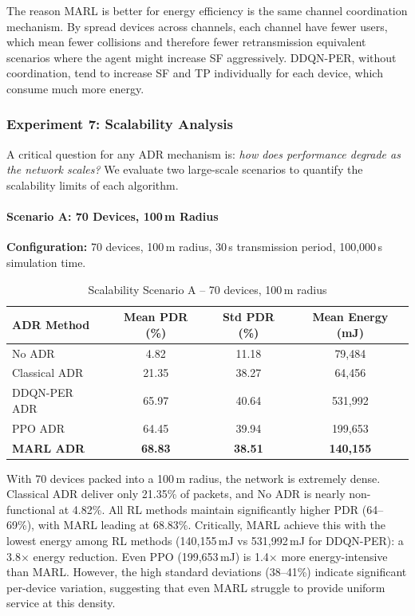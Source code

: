 \documentclass[12pt,a4paper]{article}
\begin{document}
The reason MARL is better for energy efficiency is the same channel coordination mechanism. By spread devices across channels, each channel have fewer users, which mean fewer collisions and therefore fewer retransmission equivalent scenarios where the agent might increase SF aggressively. DDQN-PER, without coordination, tend to increase SF and TP individually for each device, which consume much more energy.


\subsubsection{Experiment 7: Scalability Analysis}
\label{sec:exp7_scalability}

A critical question for any ADR mechanism is: \textit{how does performance degrade as the network scales?} We evaluate two large-scale scenarios to quantify the scalability limits of each algorithm.

\paragraph{Scenario A: 70 Devices, 100\,m Radius}

\textbf{Configuration:} 70 devices, 100\,m radius, 30\,s transmission period, 100,000\,s simulation time.

\begin{table}[H]
\centering
\caption{Scalability Scenario A -- 70 devices, 100\,m radius}
\label{tab:scale_70}
\begin{tabular}{@{}lccc@{}}
\toprule
\textbf{ADR Method} & \textbf{Mean PDR (\%)} & \textbf{Std PDR (\%)} & \textbf{Mean Energy (mJ)} \\
\midrule
No ADR          & 4.82  & 11.18 & 79,484 \\
Classical ADR   & 21.35 & 38.27 & 64,456 \\
DDQN-PER ADR    & 65.97 & 40.64 & 531,992 \\
PPO ADR         & 64.45 & 39.94 & 199,653 \\
\textbf{MARL ADR} & \textbf{68.83} & \textbf{38.51} & \textbf{140,155} \\
\bottomrule
\end{tabular}
\end{table}

With 70 devices packed into a 100\,m radius, the network is extremely dense. Classical ADR deliver only 21.35\% of packets, and No ADR is nearly non-functional at 4.82\%. All RL methods maintain significantly higher PDR (64--69\%), with MARL leading at 68.83\%. Critically, MARL achieve this with the lowest energy among RL methods (140,155\,mJ vs 531,992\,mJ for DDQN-PER): a 3.8$\times$ energy reduction. Even PPO (199,653\,mJ) is 1.4$\times$ more energy-intensive than MARL. However, the high standard deviations (38--41\%) indicate significant per-device variation, suggesting that even MARL struggle to provide uniform service at this density.
\end{document}
